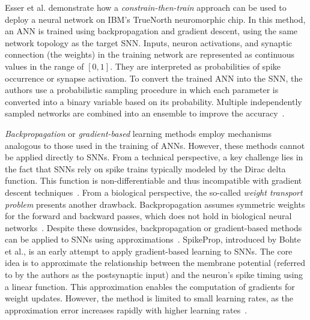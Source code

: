 Esser et al. demonstrate how a \textit{constrain-then-train} approach can be used to deploy a neural network on IBM's TrueNorth neuromorphic chip.  
In this method, an \ac{ANN} is trained using backpropagation and gradient descent, using the same network topology as the target \ac{SNN}.   
Inputs, neuron activations, and synaptic connection (the weights) in the training network are represented as continuous values in the range of \([0, 1]\).
They are interpreted as probabilities of spike occurrence or synapse activation.  
To convert the trained \ac{ANN} into the \ac{SNN}, the authors use a probabilistic sampling procedure in which each parameter is converted into a binary variable based on its probability.  
Multiple independently sampled networks are combined into an ensemble to improve the accuracy~\cite{esser_backpropagation_2015}.

\textit{Backpropagation} or \textit{gradient-based} learning methods employ mechanisms analogous to those used in the training of \acp{ANN}.  
However, these methods cannot be applied directly to \acp{SNN}.  
From a technical perspective, a key challenge lies in the fact that \acp{SNN} rely on spike trains typically modeled by the Dirac delta function.
This function is non-differentiable and thus incompatible with gradient descent techniques~\cite{tavanaei_deep_2019, pietrzak_overview_2023}.  
From a biological perspective, the so-called \textit{weight transport problem} presents another drawback.
Backpropagation assumes symmetric weights for the forward and backward passes, which does not hold in biological neural networks~\cite{tavanaei_deep_2019, nunes_spiking_2022}.
Despite these downsides, backpropagation or gradient-based methods can be applied to \acp{SNN} using approximations~\cite{tavanaei_deep_2019}.
SpikeProp, introduced by Bohte et al., is an early attempt to apply gradient-based learning to \acp{SNN}.  
The core idea is to approximate the relationship between the membrane potential (referred to by the authors as the postsynaptic input) and the neuron's spike timing using a linear function.  
This approximation enables the computation of gradients for weight updates.  
However, the method is limited to small learning rates, as the approximation error increases rapidly with higher learning rates~\cite{bohte_2000_spikeprop}.


